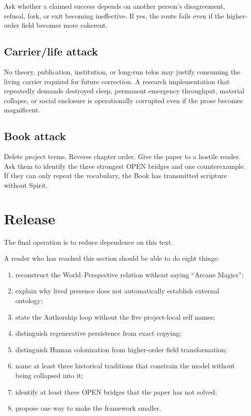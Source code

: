 \documentclass[11pt]{article}
\begin{document}
Ask whether a claimed success depends on another person's disagreement, refusal, fork, or exit becoming ineffective. If yes, the route fails even if the higher-order field becomes more coherent.

\subsection{Carrier/life attack}

No theory, publication, institution, or long-run telos may justify consuming the living carrier required for future correction. A research implementation that repeatedly demands destroyed sleep, permanent emergency throughput, material collapse, or social enclosure is operationally corrupted even if the prose becomes magnificent.

\subsection{Book attack}

Delete project terms. Reverse chapter order. Give the paper to a hostile reader. Ask them to identify the three strongest OPEN bridges and one counterexample. If they can only repeat the vocabulary, the Book has transmitted scripture without Spirit.

\section{Release}

The final operation is to reduce dependence on this text.

A reader who has reached this section should be able to do eight things:

\begin{enumerate}[leftmargin=2em]
\item reconstruct the World--Perspective relation without saying ``Arcane Magics'';
\item explain why lived presence does not automatically establish external ontology;
\item state the Authorship loop without the five project-local self names;
\item distinguish regenerative persistence from exact copying;
\item distinguish Human colonization from higher-order field transformation;
\item name at least three historical traditions that constrain the model without being collapsed into it;
\item identify at least three OPEN bridges that the paper has not solved;
\item propose one way to make the framework smaller.
\end{enumerate}
\end{document}
